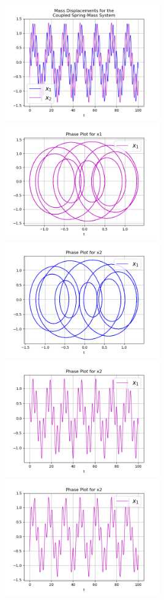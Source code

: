 \documentclass{article}
\begin{document}
\begin{center}
\includegraphics[height=5cm]{ejemplo2_3_p1.png}
\includegraphics[height=5cm]{ejemplo2_3_pt2.png}
\includegraphics[height=5cm]{ejemplo2_3_pt3.png}
\includegraphics[height=5cm]{ejemplo2_3_pt4.png}
\includegraphics[height=5cm]{ejemplo2_3_pt5.png}

\end{center}
\end{document}
